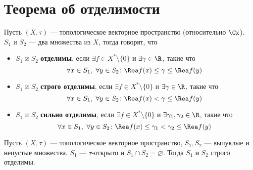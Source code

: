 \newpage
\section{Теорема об отделимости}
\begin{definition}
	Пусть $(X,\tau)$ --- топологическое векторное пространство (относительно $\Cx$). $S_1$ и $S_2$ --- два множества из $X$, тогда говорят, что 
	\begin{itemize}
		\item $S_1$ и $S_2$ \textbf{отделимы}, если $\exists f \in X^* \setminus\{0\}$ и $\exists \gamma \in \R$, такие что 
		$$
		\forall x \in S_1, \ \forall y \in S_2 \colon \Rea f(x) \leq \gamma \leq \Rea f(y)
		$$
		\item $S_1$ и $S_2$ \textbf{строго отделимы}, если $\exists f \in X^* \setminus\{0\}$ и $\exists \gamma \in \R$, такие что 
		$$
		\forall x \in S_1, \ \forall y \in S_2 \colon \Rea f(x) < \gamma \leq \Rea f(y)
		$$
		\item $S_1$ и $S_2$ \textbf{сильно отделимы}, если $\exists f \in X^* \setminus\{0\}$ и $\exists \gamma_1, \gamma_2 \in \R$, такие что 
		$$
		\forall x \in S_1, \ \forall y \in S_2 \colon \Rea f(x) \leq \gamma_1 < \gamma_2 \leq  \Rea f(y)
		$$
	\end{itemize}
\end{definition}
\begin{theorem}
	Пусть $(X,\tau)$ --- топологическое векторное пространство, $S_1, S_2$ --- выпуклые и непустые множества. $S_1$ --- $\tau$-открыто и $S_1 \cap S_2 = \varnothing$. Тогда $S_1$ и $S_2$ строго отделимы.
\end{theorem}
